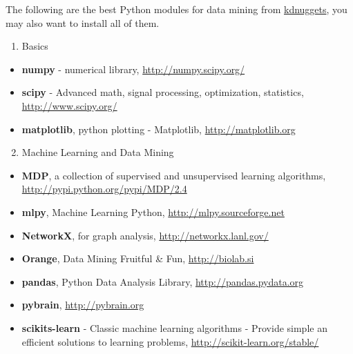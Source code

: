 \documentclass[letterpaper,11pt,english]{sphinxmanual}
\begin{document}
The following are the best Python modules for data mining from \href{http://www.kdnuggets.com/2012/11/best-python-modules-for-data-mining.html}{kdnuggets}, you may also want to install all of them.
\begin{enumerate}
\item {} 
Basics

\end{enumerate}
\begin{itemize}
\item {} 
\textbf{numpy} - numerical library, \href{http://numpy.scipy.org/}{http://numpy.scipy.org/}

\item {} 
\textbf{scipy} - Advanced math, signal processing, optimization, statistics, \href{http://www.scipy.org/}{http://www.scipy.org/}

\item {} 
\textbf{matplotlib}, python plotting - Matplotlib, \href{http://matplotlib.org}{http://matplotlib.org}

\end{itemize}
\begin{enumerate}
\setcounter{enumi}{1}
\item {} 
Machine Learning and Data Mining

\end{enumerate}
\begin{itemize}
\item {} 
\textbf{MDP}, a collection of supervised and unsupervised learning algorithms, \href{http://pypi.python.org/pypi/MDP/2.4}{http://pypi.python.org/pypi/MDP/2.4}

\item {} 
\textbf{mlpy}, Machine Learning Python, \href{http://mlpy.sourceforge.net}{http://mlpy.sourceforge.net}

\item {} 
\textbf{NetworkX}, for graph analysis, \href{http://networkx.lanl.gov/}{http://networkx.lanl.gov/}

\item {} 
\textbf{Orange}, Data Mining Fruitful \& Fun, \href{http://biolab.si}{http://biolab.si}

\item {} 
\textbf{pandas}, Python Data Analysis Library, \href{http://pandas.pydata.org}{http://pandas.pydata.org}

\item {} 
\textbf{pybrain}, \href{http://pybrain.org}{http://pybrain.org}

\item {} 
\textbf{scikits-learn} - Classic machine learning algorithms - Provide simple an efficient solutions to learning problems, \href{http://scikit-learn.org/stable/}{http://scikit-learn.org/stable/}

\end{itemize}
\end{document}
